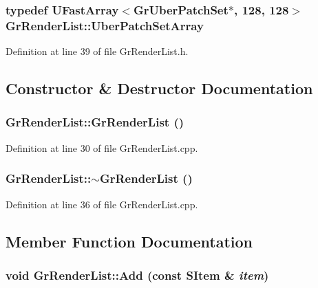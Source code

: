 \hypertarget{class_gr_render_list_aeb4dd236de429afcff762bc2ab7aecf}{
\subsubsection[{UberPatchSetArray}]{\setlength{\rightskip}{0pt plus 5cm}typedef {\bf UFastArray}$<${\bf GrUberPatchSet}$\ast$, 128, 128$>$ {\bf GrRenderList::UberPatchSetArray}}}
\label{class_gr_render_list_aeb4dd236de429afcff762bc2ab7aecf}




Definition at line 39 of file GrRenderList.h.

\subsection{Constructor \& Destructor Documentation}
\hypertarget{class_gr_render_list_23445a325c6f38273706c3240eaa380c}{
\subsubsection[{GrRenderList}]{\setlength{\rightskip}{0pt plus 5cm}GrRenderList::GrRenderList ()}}
\label{class_gr_render_list_23445a325c6f38273706c3240eaa380c}




Definition at line 30 of file GrRenderList.cpp.\hypertarget{class_gr_render_list_1c34dff29f644328255decc5059f4b17}{
\subsubsection[{$\sim$GrRenderList}]{\setlength{\rightskip}{0pt plus 5cm}GrRenderList::$\sim$GrRenderList ()}}
\label{class_gr_render_list_1c34dff29f644328255decc5059f4b17}




Definition at line 36 of file GrRenderList.cpp.

\subsection{Member Function Documentation}
\hypertarget{class_gr_render_list_28b4f24b9d4225c66460c7d6bfe0ed1c}{
\subsubsection[{Add}]{\setlength{\rightskip}{0pt plus 5cm}void GrRenderList::Add (const {\bf SItem} \& {\em item})}}
\label{class_gr_render_list_28b4f24b9d4225c66460c7d6bfe0ed1c}




